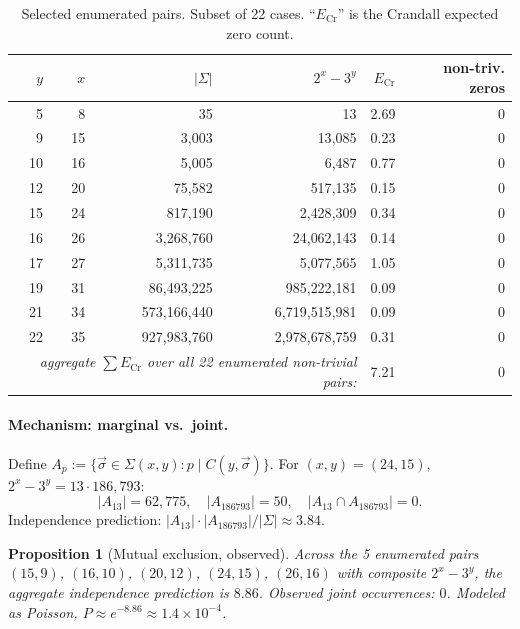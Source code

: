 \documentclass[11pt,a4paper]{article}
\theoremstyle{plain}
\newtheorem{proposition}{Proposition}
\theoremstyle{definition}
\begin{document}
\begin{table}[h]
\centering\small
\caption{Selected enumerated pairs. Subset of 22 cases. ``$E_\text{Cr}$'' is the Crandall expected zero count.}
\label{tab:agg}
\begin{tabular}{rrrrrr}
\toprule
$y$ & $x$ & $|\Sigma|$ & $2^x - 3^y$ & $E_\text{Cr}$ & non-triv. zeros \\
\midrule
5 & 8 & 35 & 13 & 2.69 & 0 \\
9 & 15 & 3{,}003 & 13{,}085 & 0.23 & 0 \\
10 & 16 & 5{,}005 & 6{,}487 & 0.77 & 0 \\
12 & 20 & 75{,}582 & 517{,}135 & 0.15 & 0 \\
15 & 24 & 817{,}190 & 2{,}428{,}309 & 0.34 & 0 \\
16 & 26 & 3{,}268{,}760 & 24{,}062{,}143 & 0.14 & 0 \\
17 & 27 & 5{,}311{,}735 & 5{,}077{,}565 & 1.05 & 0 \\
19 & 31 & 86{,}493{,}225 & 985{,}222{,}181 & 0.09 & 0 \\
21 & 34 & 573{,}166{,}440 & 6{,}719{,}515{,}981 & 0.09 & 0 \\
22 & 35 & 927{,}983{,}760 & 2{,}978{,}678{,}759 & 0.31 & 0 \\
\midrule
\multicolumn{4}{r}{\textit{aggregate $\sum E_\text{Cr}$ over all 22 enumerated non-trivial pairs:}} & 7.21 & 0 \\
\bottomrule
\end{tabular}
\end{table}

\paragraph{Mechanism: marginal vs.\ joint.} Define $A_p := \{\vec\sigma \in \Sigma(x, y) : p \mid C(y, \vec\sigma)\}$. For $(x, y) = (24, 15)$, $2^x - 3^y = 13 \cdot 186{,}793$:
\[
|A_{13}| = 62{,}775,\quad |A_{186793}| = 50,\quad |A_{13} \cap A_{186793}| = 0.
\]
Independence prediction: $|A_{13}| \cdot |A_{186793}| / |\Sigma| \approx 3.84$.

\begin{proposition}[Mutual exclusion, observed]\label{prop:exclusion}
Across the 5 enumerated pairs $(15,9)$, $(16,10)$, $(20,12)$, $(24,15)$, $(26,16)$ with composite $2^x - 3^y$, the aggregate independence prediction is $8.86$. Observed joint occurrences: $0$. Modeled as Poisson, $P \approx e^{-8.86} \approx 1.4 \times 10^{-4}$.
\end{proposition}
\end{document}
